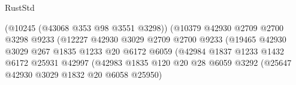 \begin{lexlean}{RustStd}
\begin{coremodule}
                                                (@10245 (@43068 @353 @98 @3551 @3298))
                                                (@10379
                                                  @42930
                                                  @2709
                                                  @2700
                                                  @3298
                                                  @9233
                                                  (@12227
                                                    @42930
                                                    @3029
                                                    @2709
                                                    @2700
                                                    @9233
                                                    (@19465
                                                      @42930
                                                      @3029
                                                      @267
                                                      @1835
                                                      @1233
                                                      @20
                                                      @6172
                                                      @6059
                                                      (@42984
                                                        @1837
                                                        @1233
                                                        @1432
                                                        @6172
                                                        @25931
                                                        @42997
                                                        (@42983
                                                          @1835
                                                          @120
                                                          @20
                                                          @28
                                                          @6059
                                                          @3292
                                                          (@25647
                                                            @42930
                                                            @3029
                                                            @1832
                                                            @20
                                                            @6058
                                                            @25950)

\end{coremodule}
\end{lexlean}
